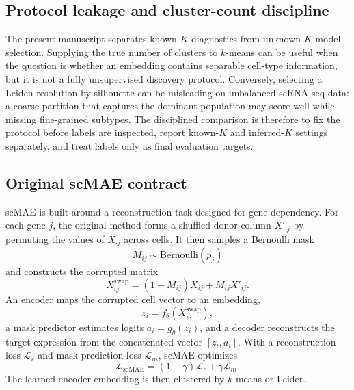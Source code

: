 \documentclass[11pt]{article}
\begin{document}
\subsection{Protocol leakage and cluster-count discipline}

The present manuscript separates known-$K$ diagnostics from unknown-$K$ model selection. Supplying the true number of clusters to $k$-means can be useful when the question is whether an embedding contains separable cell-type information, but it is not a fully unsupervised discovery protocol. Conversely, selecting a Leiden resolution by silhouette can be misleading on imbalanced scRNA-seq data: a coarse partition that captures the dominant population may score well while missing fine-grained subtypes. The disciplined comparison is therefore to fix the protocol before labels are inspected, report known-$K$ and inferred-$K$ settings separately, and treat labels only as final evaluation targets.

\subsection{Original scMAE contract}

scMAE is built around a reconstruction task designed for gene dependency. For each gene $j$, the original method forms a shuffled donor column $X'_{\cdot j}$ by permuting the values of $X_{\cdot j}$ across cells. It then samples a Bernoulli mask
\begin{equation}
M_{ij} \sim \mathrm{Bernoulli}(p_j)
\end{equation}
and constructs the corrupted matrix
\begin{equation}
X^{\mathrm{swap}}_{ij}
= (1-M_{ij})X_{ij} + M_{ij}X'_{ij}.
\end{equation}
An encoder maps the corrupted cell vector to an embedding,
\begin{equation}
z_i = f_{\theta}(X^{\mathrm{swap}}_{i\cdot}),
\end{equation}
a mask predictor estimates logits $a_i=g_{\theta}(z_i)$, and a decoder reconstructs the target expression from the concatenated vector $[z_i,a_i]$. With a reconstruction loss $\mathcal{L}_{r}$ and mask-prediction loss $\mathcal{L}_{m}$, scMAE optimizes
\begin{equation}
\mathcal{L}_{\mathrm{scMAE}}
= (1-\gamma)\mathcal{L}_{r} + \gamma\mathcal{L}_{m}.
\end{equation}
The learned encoder embedding is then clustered by $k$-means or Leiden.
\end{document}

